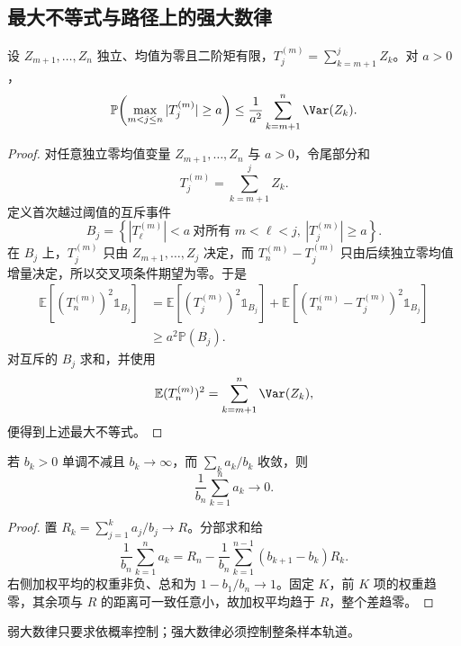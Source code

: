 \subsection{最大不等式与路径上的强大数律}
\begin{lemma}
设 $Z_{m+1},\ldots,Z_n$ 独立、均值为零且二阶矩有限，$T_j^{(m)}=\sum_{k=m+1}^jZ_k$。对 $a>0$，
\begin{equation}\label{eq:math-stat-kolmogorov-maximal}
 \mathbb P\!\left(
 \max_{m<j\le n}|T_j^{(m)}|\ge a
 \right)
 \le
 \frac1{a^2}\sum_{k=m+1}^n\Var(Z_k).
\end{equation}
\end{lemma}
\begin{proof}
对任意独立零均值变量 $Z_{m+1},\ldots,Z_n$ 与 $a>0$，令尾部分和
\[
 T_j^{(m)}=\sum_{k=m+1}^jZ_k.
\]
定义首次越过阈值的互斥事件
\[
 B_j
 =\left\{
 |T_\ell^{(m)}|<a\ \text{对所有 }m<\ell<j,
 \ |T_j^{(m)}|\ge a
 \right\}.
\]
在 $B_j$ 上，$T_j^{(m)}$ 只由 $Z_{m+1},\ldots,Z_j$ 决定，而 $T_n^{(m)}-T_j^{(m)}$ 只由后续独立零均值增量决定，所以交叉项条件期望为零。于是
\begin{align*}
 \mathbb E\!\left[(T_n^{(m)})^2\mathds{1}_{B_j}\right]
 &=\mathbb E\!\left[(T_j^{(m)})^2\mathds{1}_{B_j}\right]
 +\mathbb E\!\left[(T_n^{(m)}-T_j^{(m)})^2\mathds{1}_{B_j}\right]\\
 &\ge a^2\mathbb P(B_j).
\end{align*}
对互斥的 $B_j$ 求和，并使用
\[
 \mathbb E(T_n^{(m)})^2=\sum_{k=m+1}^n\Var(Z_k),
\]
便得到上述最大不等式。

\end{proof}

\begin{lemma}[Kronecker 引理]
若 $b_k>0$ 单调不减且 $b_k\to\infty$，而 $\sum_k a_k/b_k$ 收敛，则
\[
 \frac1{b_n}\sum_{k=1}^n a_k\longrightarrow0.
\]
\end{lemma}
\begin{proof}
置 $R_k=\sum_{j=1}^k a_j/b_j\to R$。分部求和给
\[
 \frac1{b_n}\sum_{k=1}^na_k
 =R_n-\frac1{b_n}\sum_{k=1}^{n-1}(b_{k+1}-b_k)R_k.
\]
右侧加权平均的权重非负、总和为 $1-b_1/b_n\to1$。固定 $K$，前 $K$ 项的权重趋零，其余项与 $R$ 的距离可一致任意小，故加权平均趋于 $R$，整个差趋零。
\end{proof}

弱大数律只要求依概率控制；强大数律必须控制整条样本轨道。

